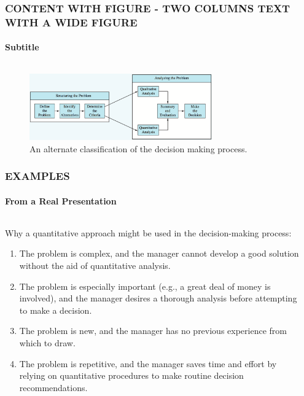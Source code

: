 \documentclass[14 pt]{beamer}
\begin{document}
\begin{frame}[t]
\frametitle{CONTENT WITH FIGURE - TWO COLUMNS TEXT WITH A WIDE FIGURE}
\framesubtitle{Subtitle}

\begin{columns}[t]
\begin{column}{0.45\textwidth}
\lipsum[8][1-4]
\end{column}

\begin{column}{0.45\textwidth}
\lipsum[9][1-4]
\end{column}
\end{columns}
\vskip1.5cm%
\begin{figure}[t]
\includegraphics[width=0.7\textwidth]{img/alternate-classification}
\caption{An alternate classification of the decision making process.}
\end{figure}

\end{frame}


\begin{frame}[t]
\frametitle{EXAMPLES}
\framesubtitle{From a Real Presentation}

\begin{columns}[t]
\begin{column}{0.45\textwidth}
Why a quantitative approach might be used in the decision-making process:

\begin{enumerate}
  \item The problem is complex, and the manager cannot develop a good solution without the aid of quantitative analysis.
  \item The problem is especially important (e.g., a great deal of money is involved), and the manager desires a thorough analysis before attempting to make a decision.
  \item The problem is new, and the manager has no previous experience from which to draw.
  \item The problem is repetitive, and the manager saves time and effort by relying on quantitative procedures to make routine decision recommendations.
\end{enumerate}

\end{column}

\begin{column}{0.45\textwidth}
\end{column}
\end{columns}
\end{frame}
\end{document}
